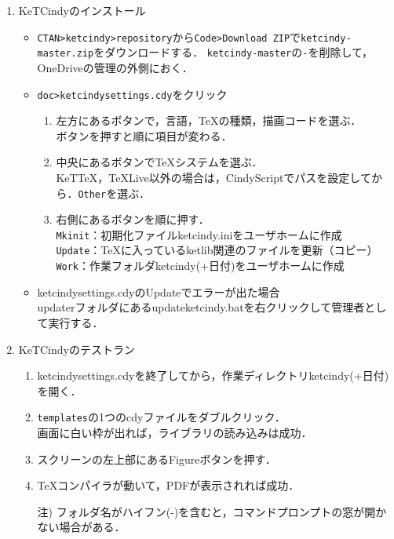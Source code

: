 \documentclass{ujarticle}
\begin{document}
\begin{enumerate}[\bf\large 1.]
\item KeTCindyのインストール
\begin{itemize}
\item \verb|CTAN>ketcindy>repository|から\verb|Code>Download ZIP|で\verb|ketcindy-master.zip|をダウンロードする．
\verb|ketcindy-master|の\verb|-|を削除して，OneDriveの管理の外側におく．
\item \verb|doc>ketcindysettings.cdy|をクリック
\begin{enumerate}[(1)]
\item 左方にあるボタンで，言語，TeXの種類，描画コードを選ぶ．\\
\hspace*{10mm}ボタンを押すと順に項目が変わる．
\item 中央にあるボタンでTeXシステムを選ぶ．\\
\hspace*{10mm}KeTTeX，TeXLive以外の場合は，CindyScriptでパスを設定してから．\verb|Other|を選ぶ．
\item 右側にあるボタンを順に押す．\\
\hspace*{10mm}\verb|Mkinit|：初期化ファイルketcindy.iniをユーザホームに作成\\
\hspace*{10mm}\verb|Update|：TeXに入っているketlib関連のファイルを更新（コピー）\\
\hspace*{10mm}\verb|Work|：作業フォルダketcindy(+日付)をユーザホームに作成
\end{enumerate}
\item ketcindysettings.cdyのUpdateでエラーが出た場合\\
\hspace*{10mm}updaterフォルダにあるupdateketcindy.batを右クリックして管理者として実行する．
\end{itemize}

\item KeTCindyのテストラン
    \begin{enumerate}[(1)]
    \item ketcindysettings.cdyを終了してから，作業ディレクトリketcindy(+日付)を開く．
    \item \verb|templates|の1つのcdyファイルをダブルクリック．\\
      \hspace*{10mm}画面に白い枠が出れば，ライブラリの読み込みは成功．
    \item スクリーンの左上部にあるFigureボタンを押す．
    \item \TeX コンパイラが動いて，PDFが表示されれば成功．
   \item[注)] フォルダ名がハイフン(-)を含むと，コマンドプロンプトの窓が開かない場合がある．
  \end{enumerate}


\end{enumerate}
\end{document}
